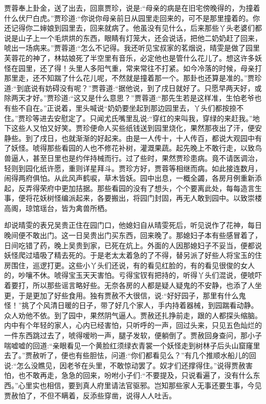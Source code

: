\begin{parag}
    贾蓉奉上卦金，送了出去，回禀贾珍，说是:“母亲的病是在旧宅傍晚得的，为撞着什么伏尸白虎。”贾珍道:“你说你母亲前日从园里走回来的，可不是那里撞着的。你还记得你二婶娘到园里去，回来就病了。他虽没有见什么，后来那些丫头老婆们都说是山子上一个毛烘烘的东西，眼睛有灯笼大，还会说话，把他二奶奶赶了回来，唬出一场病来。”贾蓉道:“怎么不记得。我还听见宝叔家的茗烟说，晴雯是做了园里芙蓉花的神了，林姑娘死了半空里有音乐，必定他也是管什么花儿了。想这许多妖怪在园里，还了得！头里人多阳气重，常来常往不打紧。如今冷落的时候，母亲打那里走，还不知踹了什么花儿呢，不然就是撞着那一个。那卦也还算是准的。”贾珍道:“到底说有妨碍没有呢？”贾蓉道:“据他说，到了戌日就好了。只愿早两天好，或除两天才好。”贾珍道:“这又是什么意思？”贾蓉道:“那先生若是这样准，生怕老爷也有些不自在。”正说着，里头喊说“奶奶要坐起到那边园里去，丫头们都按捺不住。”贾珍等进去安慰定了。只闻尤氏嘴里乱说:“穿红的来叫我，穿绿的来赶我。”地下这些人又怕又好笑。贾珍便命人买些纸钱送到园里烧化，果然那夜出了汗，便安静些。到了戌日，也就渐渐的好起来。由是一人传十，十人传百，都说大观园中有了妖怪。唬得那些看园的人也不修花补树，灌溉果蔬。起先晚上不敢行走，以致鸟兽逼人，甚至日里也是约伴持械而行。过了些时，果然贾珍患病。竟不请医调治，轻则到园化纸许愿，重则详星拜斗。贾珍方好，贾蓉等相继而病。如此接连数月，闹得两府俱怕。从此风声鹤唳，草木皆妖。园中出息，一概全蠲，各房月例重新添起，反弄得荣府中更加拮据。那些看园的没有了想头，个个要离此处，每每造言生事，便将花妖树怪编派起来，各要搬出，将园门封固，再无人敢到园中。以致崇楼高阁，琼馆瑶台，皆为禽兽所栖。
\end{parag}


\begin{parag}
    却说晴雯的表兄吴贵正住在园门口，他媳妇自从晴雯死后，听见说作了花神，每日晚间便不敢出门。这一日吴贵出门买东西，回来晚了。那媳妇子本有些感冒着了，日间吃错了药，晚上吴贵到家，已死在炕上。外面的人因那媳妇子不妥当，便都说妖怪爬过墙吸了精去死的。于是老太太着急的了不得，替另派了好些人将宝玉的住房围住，巡逻打更。这些小丫头们还说，有的看见红脸的，有的看见很俊的女人的，吵嚷不休。唬得宝玉天天害怕。亏得宝钗有把持的，听得丫头们混说，便唬吓着要打，所以那些谣言略好些。无奈各房的人都是疑人疑鬼的不安静，也添了人坐更，于是更加了好些食用。独有贾赦不大很信，说:“好好园子，那里有什么鬼怪！”挑了个风清日暖的日子，带了好几个家人，手内持着器械，到园踹看动静。众人劝他不依。到了园中，果然阴气逼人。贾赦还扎挣前走，跟的人都探头缩脑。内中有个年轻的家人，心内已经害怕，只听呼的一声，回过头来，只见五色灿烂的一件东西跳过去了，唬得嗳哟一声，腿子发软，便躺倒了。贾赦回身查问，那小子喘嘘嘘的回道:“亲眼看见一个黄脸红须绿衣青裳一个妖怪走到树林子后头山窟窿里去了。”贾赦听了，便也有些胆怯，问道:“你们都看见么？”有几个推顺水船儿的回说:“怎么没瞧见，因老爷在头里，不敢惊动罢了。奴才们还撑得住。”说得贾赦害怕，也不敢再走，急急的回来，吩咐小子们:“不要提及，只说看遍了，没有什么东西。”心里实也相信，要到真人府里请法官驱邪。岂知那些家人无事还要生事，今见贾赦怕了，不但不瞒着，反添些穿凿，说得人人吐舌。
\end{parag}


